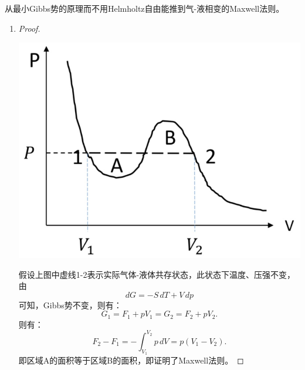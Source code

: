 \documentclass[reqno,a4paper,12pt]{amsart}
\begin{document}
\section{}
从最小Gibbs势的原理而不用Helmholtz自由能推到气-液相变的Maxwell法则。
\begin{enumerate}
	\item 
	\begin{proof}
		\begin{center}
			\includegraphics[scale=0.3]{hw2problem4.jpeg}
		\end{center}
		假设上图中虚线1-2表示实际气体-液体共存状态，此状态下温度、压强不变，由
		\[
			dG = -S\,dT + V\,dp
		\]
		可知，Gibbs势不变，则有：
		\[
			G_1 = F_1 + pV_1 = G_2 = F_2 + pV_2.
		\]
		则有：
		\[
			F_2 - F_1 = -\int_{V_1}^{V_2}p\,dV = p(V_1 - V_2).
		\]
		即区域A的面积等于区域B的面积，即证明了Maxwell法则。
	\end{proof}
\end{enumerate}
\end{document}
